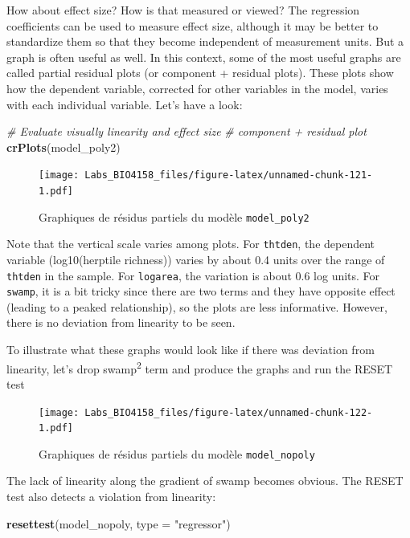 \documentclass[
  12pt,
]{book}
\newenvironment{Shaded}{\begin{snugshade}}{\end{snugshade}}
\newcommand{\CommentTok}[1]{\textcolor[rgb]{0.56,0.35,0.01}{\textit{#1}}}
\newcommand{\DataTypeTok}[1]{\textcolor[rgb]{0.13,0.29,0.53}{#1}}
\newcommand{\KeywordTok}[1]{\textcolor[rgb]{0.13,0.29,0.53}{\textbf{#1}}}
\newcommand{\NormalTok}[1]{#1}
\newcommand{\StringTok}[1]{\textcolor[rgb]{0.31,0.60,0.02}{#1}}
\begin{document}
How about effect size? How is that measured or viewed? The regression coefficients can be used to measure effect size, although it may be better to standardize them so that they become independent of measurement units. But a graph is often useful as well. In this context, some of the most useful graphs are called partial residual plots (or component + residual plots). These plots show how the dependent variable, corrected for other variables in the model, varies with each individual variable. Let's have a look:

\begin{Shaded}
\begin{Highlighting}[]
\CommentTok{\# Evaluate visually linearity and effect size}
\CommentTok{\# component + residual plot}
\KeywordTok{crPlots}\NormalTok{(model\_poly2)}
\end{Highlighting}
\end{Shaded}

\begin{figure}
\centering
\texttt{[image: Labs\_BIO4158\_files/figure-latex/unnamed-chunk-121-1.pdf]}
\caption{\label{fig:unnamed-chunk-121}Graphiques de résidus partiels du modèle \texttt{model\_poly2}}
\end{figure}

Note that the vertical scale varies among plots. For \texttt{thtden}, the dependent variable (log10(herptile richness)) varies by about 0.4 units over the range of \texttt{thtden} in the sample. For \texttt{logarea}, the variation is about 0.6 log units. For \texttt{swamp}, it is a bit tricky since there are two terms and they have opposite effect (leading to a peaked relationship), so the plots are less informative. However, there is no deviation from linearity to be seen.

To illustrate what these graphs would look like if there was deviation from linearity, let's drop swamp\textsuperscript{2} term and produce the graphs and run the RESET test

\begin{figure}
\centering
\texttt{[image: Labs\_BIO4158\_files/figure-latex/unnamed-chunk-122-1.pdf]}
\caption{\label{fig:unnamed-chunk-122}Graphiques de résidus partiels du modèle \texttt{model\_nopoly}}
\end{figure}

The lack of linearity along the gradient of swamp becomes obvious.
The RESET test also detects a violation from linearity:

\begin{Shaded}
\begin{Highlighting}[]
\KeywordTok{resettest}\NormalTok{(model\_nopoly, }\DataTypeTok{type =} \StringTok{"regressor"}\NormalTok{)}
\end{Highlighting}
\end{Shaded}
\end{document}
